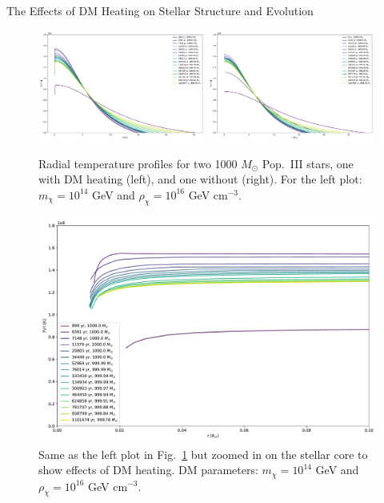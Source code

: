 \documentclass[a4paper,11pt]{article}
\begin{document}
\begin{section}{The Effects of DM Heating on Stellar Structure and Evolution}
    \begin{figure}
        \centering
        \includegraphics[width=0.49\textwidth]{T_profile_DM.pdf}
        \includegraphics[width=0.49\textwidth]{T_profile_noDM.pdf}
        \caption{Radial temperature profiles for two 1000 $M_\odot$ Pop.~III stars, one with DM heating (left), and one without (right). For the left plot: $m_\chi = 10^{14}$ GeV and $\rho_\chi = 10^{16}$ GeV cm$^{-3}$.}
        \label{MESAtemp}
    \end{figure}
    \begin{figure}
        \centering
        \includegraphics[trim={0 0.25cm 0 0.25cm},clip,width=1\textwidth]{Tcore.pdf}
        \caption{Same as the left plot in Fig.~\ref{MESAtemp} but zoomed in on the stellar core to show effects of DM heating. DM parameters: $m_\chi = 10^{14}$ GeV and $\rho_\chi = 10^{16}$ GeV cm$^{-3}$.}

\end{figure}
\end{section}
\end{document}
